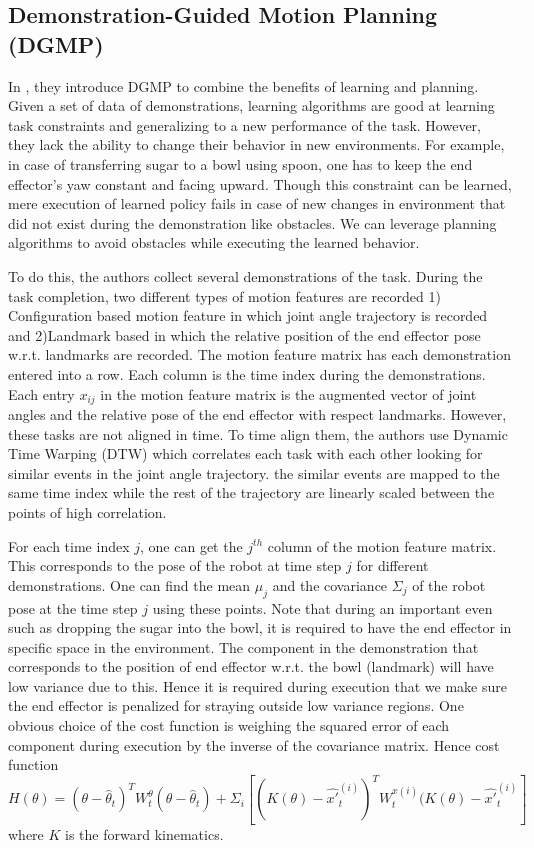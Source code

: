 \documentclass{article}[11pt]
\begin{document}
\subsection{Demonstration-Guided Motion Planning (DGMP)}
In \cite{ye2011demonstration}, they introduce DGMP to combine the benefits of learning and planning. Given a set of data of demonstrations, learning algorithms are good at learning task constraints and generalizing to a new performance of the task. However, they lack the ability to change their behavior in new environments. For example, in case of transferring sugar to a bowl using spoon, one has to keep the end effector's yaw constant and facing upward. Though this constraint can be learned, mere execution of learned policy fails in case of new changes in environment that did not exist during the demonstration like obstacles. We can leverage planning algorithms to avoid obstacles while executing the learned behavior. 

To do this, the authors collect several demonstrations of the task. During the task completion, two different types of motion features are recorded 1) Configuration based motion feature in which joint angle trajectory is recorded and 2)Landmark based in which the relative position of the end effector pose w.r.t. landmarks are recorded. The motion feature matrix has each demonstration entered into a row. Each column is the time index during the demonstrations. Each entry $x_{ij}$ in the motion feature matrix is the augmented vector of joint angles and the relative pose of the end effector with respect landmarks. However, these tasks are not aligned in time. To time align them, the authors use Dynamic Time Warping (DTW) which correlates each task with each other looking for similar events in the joint angle trajectory. the similar events are mapped to the same time index while the rest of the trajectory are linearly scaled between the points of high correlation. 

For each time index $j$, one can get the $j^{th}$ column of the motion feature matrix. This corresponds to the pose of the robot at time step $j$ for different  demonstrations. One can find the mean $\mu_j$ and the covariance $\Sigma_j$ of the robot pose at the time step $j$ using these points. Note that during an important even such as dropping the sugar into the bowl, it is required to have the end effector in specific space in the environment. The component in the demonstration that corresponds to the position of end effector w.r.t. the bowl (landmark) will have low variance due to this. Hence it is required during execution that we make sure the end effector is penalized for straying outside low variance regions. One obvious choice of the cost function is weighing the squared error of each component during execution by the inverse of the covariance matrix. Hence cost function $H(\theta) = (\theta - \hat{\theta}_t)^TW^{\theta}_t(\theta - \hat{\theta}_t) + \Sigma_i[(K(\theta) - \hat{x'}_t^{(i)})^TW^{x(i)}_t(K(\theta) - \hat{x'}_t^{(i)}]$ where $K$ is the forward kinematics. 
\end{document}
